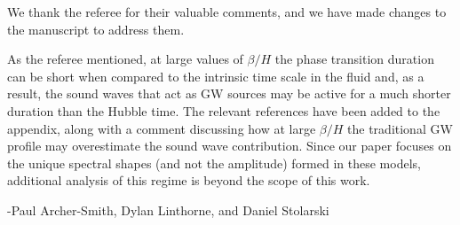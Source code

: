 \documentclass[12pt,letterpaper]{article}
\begin{document}
We thank the referee for their valuable comments, and we have made changes to the manuscript to address them. 

As the referee mentioned, at large values of $\beta/H$ the phase transition duration can be short when compared to the intrinsic time scale in the fluid and, as a result, the sound waves that act as GW sources may be active for a much shorter duration than the Hubble time. The relevant references have been added to the appendix, along with a comment discussing how at large $\beta/H$ the traditional GW profile may overestimate the sound wave contribution. Since our paper focuses on the unique spectral shapes (and not the amplitude) formed in these models, additional analysis of this regime is beyond the scope of this work.

-Paul Archer-Smith, Dylan Linthorne, and Daniel Stolarski
\end{document}
